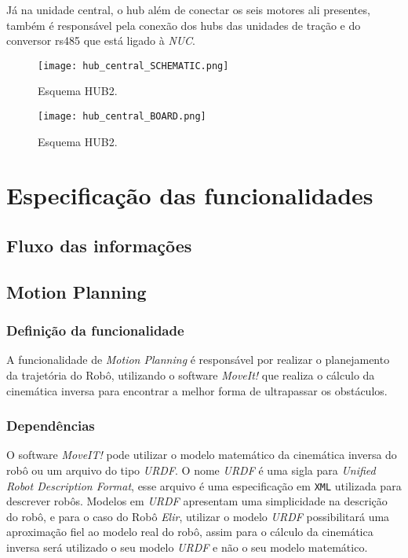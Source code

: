 Já na unidade central, o hub além de conectar os seis motores ali presentes, também é responsável pela conexão dos hubs das unidades de tração e do conversor rs485 que está ligado à \textit{NUC}.
\begin{figure}[h!]												
	\centering												
	\texttt{[image: hub\_central\_SCHEMATIC.png]}				
	\caption{Esquema HUB2.}		
	\label{img:hub2}									
\end{figure}

\begin{figure}[h!]												
	\centering												
	\texttt{[image: hub\_central\_BOARD.png]}				
	\caption{Esquema HUB2.}		
	\label{img:hub2}									
\end{figure}

\section{Especificação das funcionalidades}
\label{sec:espf}


\subsection{Fluxo das informações}
\label{ssec:fluxo}


\subsection{Motion Planning}
\label{ssec:motion}
\subsubsection{Definição da funcionalidade}
A funcionalidade de \textit{Motion Planning} é responsável por realizar o planejamento da trajetória do Robô, utilizando o software \textit{MoveIt!} que realiza o cálculo da cinemática inversa para encontrar a melhor forma de ultrapassar os obstáculos.
\subsubsection{Dependências}
O software \textit{MoveIT!} pode utilizar o modelo matemático da cinemática inversa do robô ou um arquivo do tipo \textit{URDF}.
O nome \textit{URDF} é uma sigla para \textit{Unified Robot Description Format}, esse arquivo é uma especificação em \verb|XML| utilizada para descrever robôs. Modelos em \textit{URDF} apresentam uma simplicidade na descrição do robô, e para o caso do Robô \textit{Elir}, utilizar o modelo \textit{URDF} possibilitará uma aproximação fiel ao modelo real do robô, assim para o cálculo da cinemática inversa será utilizado o seu modelo \textit{URDF} e não o seu modelo matemático.

